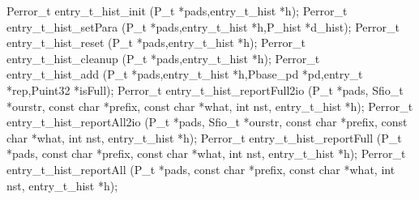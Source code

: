 \begin{code}
Perror\_t entry\_t\_hist\_init (P\_t *pads,entry\_t\_hist *h);
Perror\_t entry\_t\_hist\_setPara (P\_t *pads,entry\_t\_hist *h,P_hist *d_hist);
Perror\_t entry\_t\_hist\_reset (P\_t *pads,entry\_t\_hist *h);
Perror\_t entry\_t\_hist\_cleanup (P\_t *pads,entry\_t\_hist *h);
Perror\_t entry\_t\_hist\_add (P\_t *pads,entry\_t\_hist *h,Pbase\_pd
*pd,entry\_t *rep,Puint32 *isFull);
Perror\_t entry\_t\_hist\_reportFull2io (P\_t *pads, Sfio\_t *ourstr,
const char *prefix, const char *what, int nst, entry\_t\_hist *h); 
Perror\_t entry\_t\_hist\_reportAll2io (P\_t *pads, Sfio\_t *ourstr,
const char *prefix, const char *what, int nst, entry\_t\_hist *h); 
Perror\_t entry\_t\_hist\_reportFull (P\_t *pads, const char *prefix,
const char *what, int nst, entry\_t\_hist *h);
Perror\_t entry\_t\_hist\_reportAll (P\_t *pads, const char *prefix,
const char *what, int nst, entry\_t\_hist *h);
\end{code}
